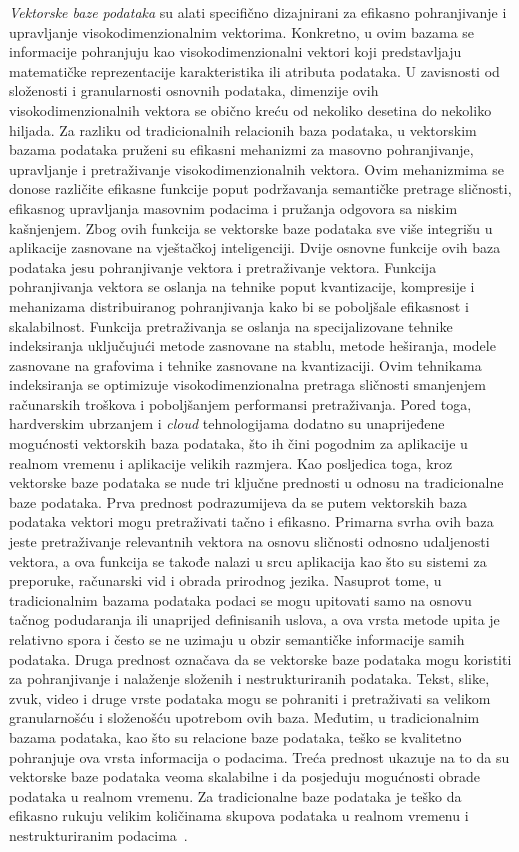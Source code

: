\emph{Vektorske baze podataka} su alati specifično dizajnirani za efikasno
pohranjivanje i upravljanje visokodimenzionalnim vektorima. Konkretno, u ovim
bazama se informacije pohranjuju kao visokodimenzionalni vektori koji
predstavljaju matematičke reprezentacije karakteristika ili atributa podataka.
U zavisnosti od složenosti i granularnosti osnovnih podataka, dimenzije ovih
visokodimenzionalnih vektora se obično kreću od nekoliko desetina do nekoliko
hiljada. Za razliku od tradicionalnih relacionih baza podataka, u vektorskim
bazama podataka pruženi su efikasni mehanizmi za masovno pohranjivanje,
upravljanje i pretraživanje visokodimenzionalnih vektora. Ovim mehanizmima se
donose različite efikasne funkcije poput podržavanja semantičke pretrage
sličnosti, efikasnog upravljanja masovnim podacima i pružanja odgovora sa
niskim kašnjenjem. Zbog ovih funkcija se vektorske baze podataka sve više
integrišu u aplikacije zasnovane na vještačkoj inteligenciji. Dvije osnovne
funkcije ovih baza podataka jesu pohranjivanje vektora i pretraživanje vektora.
Funkcija pohranjivanja vektora se oslanja na tehnike poput kvantizacije,
kompresije i mehanizama distribuiranog pohranjivanja kako bi se poboljšale
efikasnost i skalabilnost. Funkcija pretraživanja se oslanja na specijalizovane
tehnike indeksiranja uključujući metode zasnovane na stablu, metode heširanja,
modele zasnovane na grafovima i tehnike zasnovane na kvantizaciji. Ovim
tehnikama indeksiranja se optimizuje visokodimenzionalna pretraga sličnosti
smanjenjem računarskih troškova i poboljšanjem performansi pretraživanja. Pored
toga, hardverskim ubrzanjem i \foreignlanguage{english}{\emph{cloud}} tehnologijama
dodatno su unaprijeđene mogućnosti vektorskih baza podataka, što ih čini pogodnim za
aplikacije u realnom vremenu i aplikacije velikih razmjera.
Kao posljedica toga, kroz vektorske baze podataka se nude tri ključne prednosti
u odnosu na tradicionalne baze podataka. Prva prednost podrazumijeva da se putem
vektorskih baza podataka vektori mogu pretraživati tačno i efikasno. Primarna
svrha ovih baza jeste pretraživanje relevantnih vektora na osnovu sličnosti
odnosno udaljenosti vektora, a ova funkcija se takođe nalazi u srcu aplikacija
kao što su sistemi za preporuke, računarski vid i obrada prirodnog jezika.
Nasuprot tome, u tradicionalnim bazama podataka podaci se mogu upitovati samo
na osnovu tačnog podudaranja ili unaprijed definisanih uslova, a ova vrsta
metode upita je relativno spora i često se ne uzimaju u obzir semantičke
informacije samih podataka. Druga prednost označava da se vektorske baze podataka
mogu koristiti za pohranjivanje i nalaženje složenih i nestrukturiranih
podataka. Tekst, slike, zvuk, video i druge vrste podataka mogu se pohraniti i
pretraživati sa velikom granularnošću i složenošću upotrebom ovih baza.
Međutim, u tradicionalnim bazama podataka, kao što su relacione baze podataka,
teško se kvalitetno pohranjuje ova vrsta informacija o podacima. Treća prednost
ukazuje na to da su vektorske baze podataka veoma skalabilne i da posjeduju
mogućnosti obrade podataka u realnom vremenu. Za tradicionalne baze podataka
je teško da efikasno rukuju velikim količinama skupova podataka u realnom
vremenu i nestrukturiranim podacima~\cite{ma2026comprehensive}.

